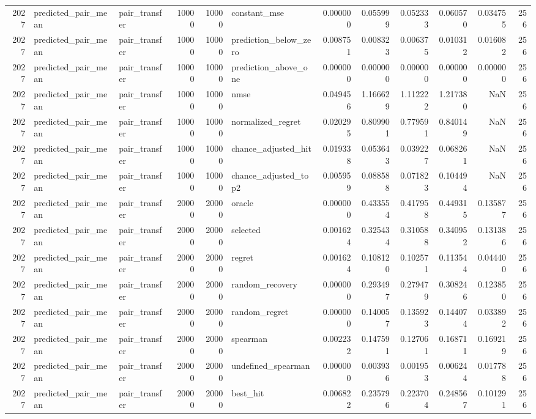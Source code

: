\begin{tabular}{rllrrlrrrrrr}
2027 & predicted_pair_mean & pair_transfer & 10000 & 10000 & constant_mse & 0.000000 & 0.055999 & 0.052333 & 0.060570 & 0.034755 & 256 \\
2027 & predicted_pair_mean & pair_transfer & 10000 & 10000 & prediction_below_zero & 0.008751 & 0.008323 & 0.006375 & 0.010312 & 0.016082 & 256 \\
2027 & predicted_pair_mean & pair_transfer & 10000 & 10000 & prediction_above_one & 0.000000 & 0.000000 & 0.000000 & 0.000000 & 0.000000 & 256 \\
2027 & predicted_pair_mean & pair_transfer & 10000 & 10000 & nmse & 0.049456 & 1.166629 & 1.112222 & 1.217380 & NaN & 256 \\
2027 & predicted_pair_mean & pair_transfer & 10000 & 10000 & normalized_regret & 0.020295 & 0.809901 & 0.779591 & 0.840149 & NaN & 256 \\
2027 & predicted_pair_mean & pair_transfer & 10000 & 10000 & chance_adjusted_hit & 0.019338 & 0.053643 & 0.039227 & 0.068261 & NaN & 256 \\
2027 & predicted_pair_mean & pair_transfer & 10000 & 10000 & chance_adjusted_top2 & 0.005959 & 0.088588 & 0.071823 & 0.104494 & NaN & 256 \\
2027 & predicted_pair_mean & pair_transfer & 20000 & 20000 & oracle & 0.000000 & 0.433554 & 0.417958 & 0.449315 & 0.135877 & 256 \\
2027 & predicted_pair_mean & pair_transfer & 20000 & 20000 & selected & 0.001624 & 0.325434 & 0.310588 & 0.340952 & 0.131386 & 256 \\
2027 & predicted_pair_mean & pair_transfer & 20000 & 20000 & regret & 0.001624 & 0.108120 & 0.102571 & 0.113544 & 0.044400 & 256 \\
2027 & predicted_pair_mean & pair_transfer & 20000 & 20000 & random_recovery & 0.000000 & 0.293497 & 0.279479 & 0.308246 & 0.123850 & 256 \\
2027 & predicted_pair_mean & pair_transfer & 20000 & 20000 & random_regret & 0.000000 & 0.140057 & 0.135923 & 0.144074 & 0.033892 & 256 \\
2027 & predicted_pair_mean & pair_transfer & 20000 & 20000 & spearman & 0.002232 & 0.147591 & 0.127061 & 0.168711 & 0.169219 & 256 \\
2027 & predicted_pair_mean & pair_transfer & 20000 & 20000 & undefined_spearman & 0.000000 & 0.003936 & 0.001953 & 0.006244 & 0.017788 & 256 \\
2027 & predicted_pair_mean & pair_transfer & 20000 & 20000 & best_hit & 0.006822 & 0.235796 & 0.223704 & 0.248567 & 0.101291 & 256 \\

\end{tabular}
